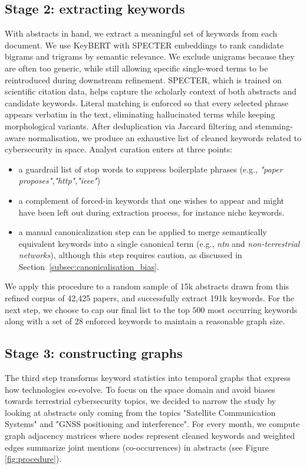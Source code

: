 \documentclass[pdflatex,sn-basic]{sn-jnl}
\begin{document}
\subsection{Stage 2: extracting keywords}
\label{keywordextraction}
With abstracts in hand, we extract a meaningful set of keywords from each document. We use KeyBERT with SPECTER embeddings to rank candidate bigrams and trigrams by semantic relevance. We exclude unigrams because they are often too generic, while still allowing specific single-word terms to be reintroduced during downstream refinement. SPECTER, which is trained on scientific citation data, helps capture the scholarly context of both abstracts and candidate keywords. Literal matching is enforced so that every selected phrase appears verbatim in the text, eliminating hallucinated terms while keeping morphological variants. After deduplication via Jaccard filtering and stemming-aware normalisation, we produce an exhaustive list of cleaned keywords related to cybersecurity in space. 
Analyst curation enters at three points:
\begin{itemize}
\item a guardrail list of stop words to suppress boilerplate phrases (e.g., \textit{"paper proposes"},\textit{"http"},\textit{"ieee"})
\item a complement of forced-in keywords that one wishes to appear and might have been left out during extraction process, for instance niche keywords.
\item a manual canonicalization step can be applied to merge semantically equivalent keywords into a single canonical term (e.g., \textit{ntn} and \textit{non-terrestrial networks}), although this step requires caution, as discussed in Section~\ref{subsec:canonicalisation_bias}.
\end{itemize}
We apply this procedure to a random sample of 15k abstracts drawn from this refined corpus of 42,425 papers, and successfully extract 191k keywords.
For the next step, we choose to cap our final list to the top $500$ most occurring keywords along with a set of $28$ enforced keywords to maintain a reasonable graph size.

\subsection{Stage 3: constructing graphs}

The third step transforms keyword statistics into temporal graphs that express how technologies co-evolve.
To focus on the space domain and avoid biases towards terrestrial cybersecurity topics, we decided to narrow the study by looking at abstracts only coming from the topics "Satellite Communication Systems" and "GNSS positioning and interference".
For every month, we compute graph adjacency matrices where nodes represent cleaned keywords and weighted edges summarize joint mentions (co-occurrences) in abstracts (see Figure \ref{fig:procedure}).
\end{document}
